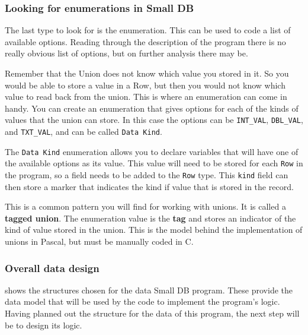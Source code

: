 
\subsubsection{Looking for enumerations in Small DB} %
\label{ssub:looking_for_enumerations_in_small_db}

The last type to look for is the enumeration. This can be used to code a list of available options. Reading through the description of the program there is no really obvious list of options, but on further analysis there may be.

Remember that the Union does not know which value you stored in it. So you would be able to store a value in a Row, but then you would not know which value to read back from the union. This is where an enumeration can come in handy. You can create an enumeration that gives options for each of the kinds of values that the union can store. In this case the options can be \texttt{INT\_VAL}, \texttt{DBL\_VAL}, and \texttt{TXT\_VAL}, and can be called \texttt{Data Kind}.

The \texttt{Data Kind} enumeration allows you to declare variables that will have one of the available options as its value. This value will need to be stored for each \texttt{Row} in the program, so a field needs to be added to the \texttt{Row} type. This \texttt{kind} field can then store a marker that indicates the kind if value that is stored in the record.

This is a common pattern you will find for working with unions. It is called a \textbf{tagged union}. The enumeration value is the \textbf{tag} and stores an indicator of the kind of value stored in the union. This is the model behind the implementation of unions in Pascal, but must be manually coded in C.


\subsubsection{Overall data design} %
\label{ssub:overall_data_design}

 shows the structures chosen for the data Small DB program. These provide the data model that will be used by the code to implement the program's logic. Having planned out the structure for the data of this program, the next step will be to design its logic.

